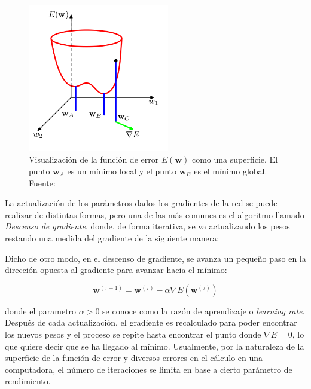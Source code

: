             \begin{figure}[!h] 
                \centering
                \includegraphics[width=0.55\textwidth]{img/gradsup}
                \caption[Visualización de la función de error]{Visualización de la función de error $E(\mathbf{w})$ como una superficie. El punto $\mathbf{w}_A$ es un mínimo local y el punto $\mathbf{w}_B$ es el mínimo global. Fuente: \cite{Bishop2006} }
                \label{fig:gradsup}
            \end{figure}

            La actualización de los parámetros dados los gradientes de la red se puede realizar de distintas formas, pero una 
            de las más comunes es el algoritmo llamado \textit{Descenso de gradiente}, donde, de forma iterativa, se 
            va actualizando los pesos restando una medida del gradiente de la siguiente manera:

            Dicho de otro modo, en el descenso de gradiente, se avanza un pequeño paso en la dirección opuesta al gradiente 
            para avanzar hacia el mínimo:

            \begin{equation}
                \mathbf{w}^{(\tau + 1)} = \mathbf{w}^{(\tau)} - \alpha \nabla E(\mathbf{w}^{(\tau)})
            \end{equation}

            donde el parametro $\alpha > 0$ se conoce como la razón de aprendizaje o \textit{learning rate}. Después de 
            cada actualización, el gradiente es recalculado para poder encontrar los nuevos pesos y el proceso se repite 
            hasta encontrar el punto donde $\nabla E = 0$, lo que quiere decir que se ha llegado al mínimo. Usualmente, por 
            la naturaleza de la superficie de la función de error y diversos errores en el cálculo en una computadora, el número 
            de iteraciones se limita en base a cierto parámetro de rendimiento.

